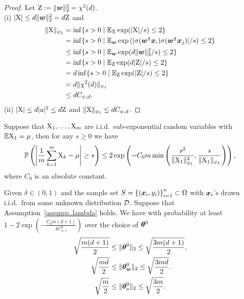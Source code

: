 \documentclass[twoside,11pt]{article}
\begin{document}
\begin{proof}
    Let
    $\textnormal{Z}:=\lVert\bm{w}\rVert^2_2=\chi^2(d)$.\\
    (i)   $\lvert\textnormal{X}\rvert\leq d\lVert\bm{w}\rVert^2_2=d\textnormal{Z}$ and
    \begin{equation*}
        \begin{aligned}
            \lVert\textnormal{X}\rVert_{\psi_1}
             & =\inf\{s>0\mid\mathbb{E}_{\textnormal{X}}\exp(\lvert\textnormal{X}\rvert/s)\leq 2\}                                               \\
             & =\inf\{s>0\mid\mathbb{E}_{\bm{w}}\exp\left(\lvert\sigma(\bm{w}^\intercal\bm{x}_i)\sigma(\bm{w}^\intercal\bm{x}_j)\rvert/s\right)\leq 2\} \\
             & \leq\inf\{s>0\mid\mathbb{E}_{\bm{w}}\exp(d\lVert\bm{w}\rVert^2_2/s)\leq 2\}                                      \\
             & =\inf\{s>0\mid\mathbb{E}_{\textnormal{Z}}\exp(d\lvert\textnormal{Z}\rvert/s)\leq 2\}                                              \\
             & =d\inf\{s>0\mid\mathbb{E}_{\textnormal{Z}}\exp(\lvert\textnormal{Z}\rvert/s)\leq 2\}                                              \\
             & =d\lVert\chi^2(d)\rVert_{\psi_1}                                                                     \\
             & \leq dC_{\psi,d}.
        \end{aligned}
    \end{equation*}
    (ii) $\lvert\textnormal{X}\rvert\leq d\lvert a\rvert^2\leq d\textnormal{Z}$ and $\lVert\textnormal{X}\rVert_{\psi_1}\leq dC_{\psi,d}$.
\end{proof}
\begin{thm}\label{thm:sub_exp}
    Suppose that $\textnormal{X}_1,\ldots,\textnormal{X}_m$ are i.i.d.\ sub-exponential random variables with $\mathbb{E}\textnormal{X}_1=\mu$, then for any $s\geq 0$ we have
    \begin{equation}
        \mathbb{P}\left(\left\lvert\frac{1}{m}\sum_{k=1}^m\textnormal{X}_k-\mu\right\rvert\geq s\right)\leq 2\exp\left(-C_0 m \min\left(\frac{s^2}{\lVert\textnormal{X}_1\rVert^2_{\psi_1}},\frac{s}{\lVert\textnormal{X}_1\rVert_{\psi_1}}\right)\right),
    \end{equation}
    where $C_0$ is an absolute constant.
\end{thm}
\begin{prop}\label{prop..InitialThetaNorm}
    Given $\delta\in(0,1)$ and the sample set $S = {\{(\bm{x}_i, y_i)\}}_{i=1}^n\subset\Omega$ with $\bm{x}_i$'s drawn i.i.d.\ from some unknown distribution $\mathcal{D}$. Suppose that Assumption~\ref{assump..lambda} holds. We have with probability at least $1-2\exp\left(-\frac{C_0m(d+1)}{4C^2_{\psi,1}}\right)$ over the choice of $\bm{\theta}^0$
    \begin{align}
        \sqrt{\frac{m(d+1)}{2}}
        &\leq \lVert\bm{\theta}^0\rVert_2\leq \sqrt{\frac{3m(d+1)}{2}},\label{eq..InitialThetaNorm}\\
        \sqrt{\frac{md}{2}}
        &\leq \lVert\bm{\theta}_{\bm{w}}^0\rVert_2\leq \sqrt{\frac{3md}{2}}.\label{eq..InitialThetavwNorm}\\
        \sqrt{\frac{m}{2}}
        &\leq \lVert\bm{\theta}_{a}^0\rVert_2\leq \sqrt{\frac{3m}{2}}.\label{eq..InitialThetaaNorm}
    \end{align}
\end{prop}
\end{document}
